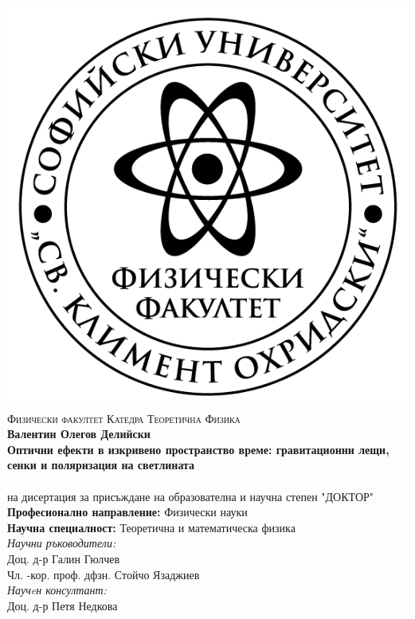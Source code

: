 \documentclass[12pt]{article}
\numberwithin{equation}{section}
\numberwithin{figure}{section}
\begin{document}
	
\thispagestyle{empty}
\begin{center}
	
	\centering
	\includegraphics[scale = 1]{Title_page/logo-FzF.png}
	\noindent\makebox[\linewidth]{\rule{15cm}{0.8pt}}
	\textsc{Физически факултет}
	\noindent\makebox[\linewidth]{\rule{15cm}{0.8pt}}
	\textsc{Катедра Теоретична	 Физика}\\
	\bigskip
	\bigskip
	\bigskip
	\bigskip
	{\Large{\textbf{Валентин Олегов Делийски}}}\\
	\bigskip
	\bigskip
	\bigskip
	{\Large \textbf{Оптични ефекти в изкривено пространство време: гравитационни лещи, сенки и поляризация на светлината}}\\
	\bigskip
	\bigskip
	\bigskip
	{\textbf{\huge {}}}\\
	\bigskip
	на дисертация за присъждане на образователна и научна степен "ДОКТОР"\\
	\bigskip
	\bigskip
	\bigskip
	\textbf{Професионално направление:} Физически науки\\
	\textbf{Научна специалност:} Теоретична и математическа физика\\
	\bigskip
	\bigskip
	\bigskip
	\bigskip
	\textit{Научни ръководители:}\\
	Доц. д-р Галин Гюлчев\\
	\bigskip
	Чл. -кор. проф. дфзн. Стойчо Язаджиев\\
	\bigskip
	\textit{Научeн консултант:}\\
	Доц. д-р Петя Недкова\\
	
	\newpage
\end{center}
\end{document}

